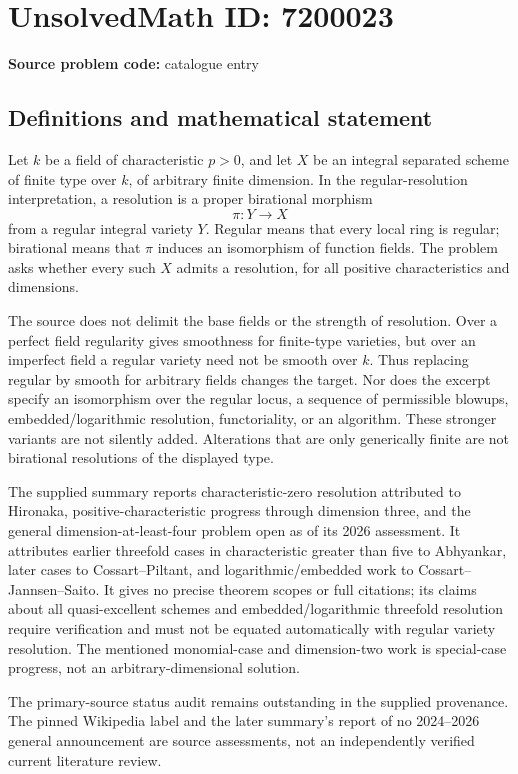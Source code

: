 \documentclass[11pt]{article}
\begin{document}
\section*{UnsolvedMath ID: 7200023}
\textbf{Source problem code:} catalogue entry
\subsection{Definitions and mathematical statement}
Let \(k\) be a field of characteristic \(p>0\), and let \(X\) be an integral separated scheme of finite type over \(k\), of arbitrary finite dimension. In the regular-resolution interpretation, a resolution is a proper birational morphism
\[
 \pi:Y\to X
\]
from a regular integral variety \(Y\). Regular means that every local ring is regular; birational means that \(\pi\) induces an isomorphism of function fields. The problem asks whether every such \(X\) admits a resolution, for all positive characteristics and dimensions.

The source does not delimit the base fields or the strength of resolution. Over a perfect field regularity gives smoothness for finite-type varieties, but over an imperfect field a regular variety need not be smooth over \(k\). Thus replacing regular by smooth for arbitrary fields changes the target. Nor does the excerpt specify an isomorphism over the regular locus, a sequence of permissible blowups, embedded/logarithmic resolution, functoriality, or an algorithm. These stronger variants are not silently added. Alterations that are only generically finite are not birational resolutions of the displayed type.

The supplied summary reports characteristic-zero resolution attributed to Hironaka, positive-characteristic progress through dimension three, and the general dimension-at-least-four problem open as of its 2026 assessment. It attributes earlier threefold cases in characteristic greater than five to Abhyankar, later cases to Cossart--Piltant, and logarithmic/embedded work to Cossart--Jannsen--Saito. It gives no precise theorem scopes or full citations; its claims about all quasi-excellent schemes and embedded/logarithmic threefold resolution require verification and must not be equated automatically with regular variety resolution. The mentioned monomial-case and dimension-two work is special-case progress, not an arbitrary-dimensional solution.

The primary-source status audit remains outstanding in the supplied provenance. The pinned Wikipedia label and the later summary's report of no 2024--2026 general announcement are source assessments, not an independently verified current literature review.
\end{document}
